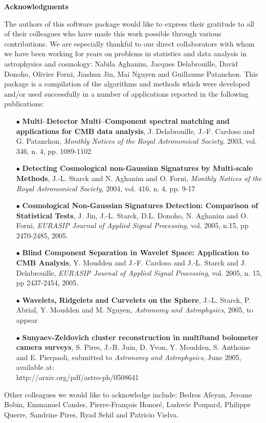 
\newpage
\thispagestyle{empty}
$ $
\newpage

{\Huge \bf Acknowledgments}\label{forewd}\\
\vspace{1cm}

The authors of this software package would like to express their 
gratitude to all of their colleagues who have made this work  
possible through various contributions. 
We are especially thankful to our direct collaborators with whom we 
have been working for years on problems in statistics and data 
analysis in astrophysics and cosmology: Nabila Aghanim, Jacques Delabrouille, David Donoho, 
Olivier Forni, Jiashun Jin, Mai Nguyen and Guillaume Patanchon.
This package is a compilation of the algorithms and methods which were 
developed and/or used successfully in a number of applications 
reported in the following publications: \\
\begin{itemize}
\item[$\bullet$]{ \textbf{ Multi--Detector Multi--Component spectral matching and applications for CMB data analysis}, J. Delabrouille, J.-F. Cardoso and G. Patanchon, \emph{Monthly Notices of the Royal Astronomical Society}, 2003, vol. 346, n. 4, pp. 1089-1102 }
\item[$\bullet$]{ \textbf{ Detecting Cosmological non-Gaussian Signatures by Multi-scale Methods}, J.-L. Starck and N. Aghanim and O. Forni, \emph{Monthly Notices of the Royal Astronomical Society}, 2004, vol. 416, n. 4, pp. 9-17 }
\item[$\bullet$]{ \textbf{ Cosmological Non-Gaussian Signatures Detection: Comparison of Statistical Tests}, J. Jin,  J.-L. Starck,  D.L. Donoho,  N. Aghanim and O. Forni, \emph{EURASIP Journal of Applied Signal Processing},  vol. 2005, n.15, pp 2470-2485, 2005.}
\item[$\bullet$]{ \textbf{ Blind Component Separation in Wavelet Space: Application to {CMB} Analysis}, Y. Moudden and J.-F. Cardoso and J.-L. Starck and J. Delabrouille, 
\emph{EURASIP Journal of Applied Signal Processing}, vol. 2005, n. 15, pp 2437-2454, 2005.}
\item[$\bullet$]{ \textbf{ Wavelets, Ridgelets and Curvelets on the Sphere},  J.-L. Starck,  P. Abrial, Y. Moudden and M. Nguyen, \emph{Astronomy and Astrophysics}, 2005, to appear}
\item[$\bullet$]{ \textbf{ Sunyaev-Zeldovich cluster reconstruction in multiband  bolometer camera surveys}, S. Pires, J.-B. Juin, D. Yvon, Y. Moudden, S. Anthoine and E. Pierpaoli, submitted to \emph{Astronomy and Astrophysics}, June 2005, available at: \\
 http://arxiv.org/pdf/astro-ph/0508641}\\
\end{itemize}

Other colleagues we would like to acknowledge include:
Bedros Afeyan, Jerome Bobin, Emmanuel Candes, Pierre-Fran{\c{c}}ois Honor\'e, Ludovic Poupard, 
Philippe Querre, Sandrine Pires, Ryad Sehil and Patricio Vielva.

\newpage
\thispagestyle{empty}
$ $
\newpage


